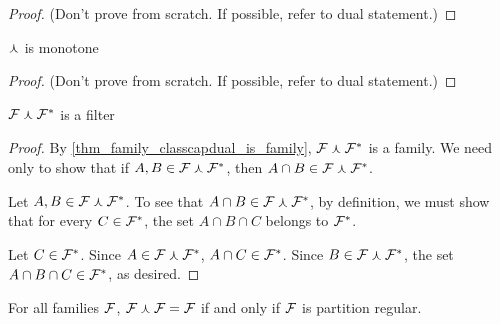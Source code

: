 \begin{proof}
    (Don't prove from scratch.  If possible, refer to dual statement.)
\end{proof}

\begin{theorem}
    \label{thm_classcapdual_monotone}
    \label{thm_classcapdual_is_monotonic}
    $\curlywedge$ is monotone
\end{theorem}

\begin{proof}
    (Don't prove from scratch.  If possible, refer to dual statement.)
\end{proof}

\begin{theorem}
    \label{thm_family_classcapdual_dual_is_filter}
    $\mathcal{F} \curlywedge \mathcal{F}^*$ is a filter
\end{theorem}

\begin{proof}
    
     By \cref{thm_family_classcapdual_is_family}, $\mathcal{F} \curlywedge \mathcal{F}^*$ is a family.  We need only to show that if $A, B \in \mathcal{F} \curlywedge \mathcal{F}^*$, then $A \cap B \in \mathcal{F} \curlywedge \mathcal{F}^*$.

    Let $A, B \in \mathcal{F} \curlywedge \mathcal{F}^*$.  To see that $A \cap B \in \mathcal{F} \curlywedge \mathcal{F}^*$, by definition, we must show that for every $C \in \mathcal{F}^*$, the set $A \cap B \cap C$ belongs to $\mathcal{F}^*$.

    Let $C \in \mathcal{F}^*$.  Since $A \in \mathcal{F} \curlywedge \mathcal{F}^*$, $A \cap C \in \mathcal{F}^*$.  Since $B \in \mathcal{F} \curlywedge \mathcal{F}^*$, the set $A \cap B \cap C \in \mathcal{F}^*$, as desired.
\end{proof}

\begin{theorem}
    \label{thm_classcapdual_idempotent_at_pr_families}
    \leanok{}
    For all families $\mathcal{F}$, $\mathcal{F} \curlywedge \mathcal{F} = \mathcal{F}$ if and only if $\mathcal{F}$ is partition regular.
\end{theorem}

